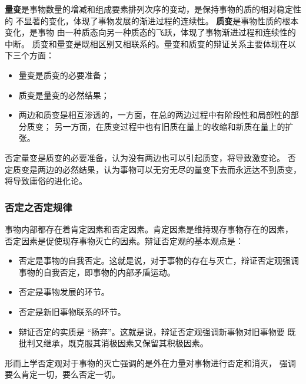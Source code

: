 \documentclass[10pt, UTF8]{book} %
\begin{document}
\textbf{量变}是事物数量的增减和组成要素排列次序的变动，是保持事物的质的相对稳定性的
不显著的变化，体现了事物发展的渐进过程的连续性。
\textbf{质变}是事物性质的根本变化，是事物
由一种质态向另一种质态的飞跃，体现了事物渐进过程和连续性的中断。
质变和量变是既相区别又相联系的。量变和质变的辩证关系主要体现在以下三个方面：
\begin{itemize}[itemsep=0pt]
    \item 量变是质变的必要准备；
    \item 质变是量变的必然结果；
    \item 两边和质变是相互渗透的，一方面，在总的两边过程中有阶段性和局部性的部分质变；
    另一方面，在质变过程中也有旧质在量上的收缩和新质在量上的扩张。
\end{itemize}
否定量变是质变的必要准备，认为没有两边也可以引起质变，将导致激变论。
否定质变是两边的必然结果，认为事物可以无穷无尽的量变下去而永远达不到质变，
将导致庸俗的进化论。

\subsubsection{否定之否定规律}

事物内部都存在着肯定因素和否定因素。肯定因素是维持现存事物存在的因素，
否定因素是促使现存事物灭亡的因素。辩证否定观的基本观点是：
\begin{itemize}[itemsep=0pt]
    \item 否定是事物的自我否定。这就是说，对于事物的存在与灭亡，辩证否定观强调
    事物的自我否定，即事物的内部矛盾运动。
    \item 否定是事物发展的环节。
    \item 否定是新旧事物联系的环节。
    \item 辩证否定的实质是 “扬弃”。这就是说，辩证否定观强调新事物对旧事物要
    既批判又继承，既克服其消极因素又保留其积极因素。
\end{itemize}
形而上学否定观对于事物的灭亡强调的是外在力量对事物进行否定和消灭，
强调要么肯定一切，要么否定一切。
\end{document}
